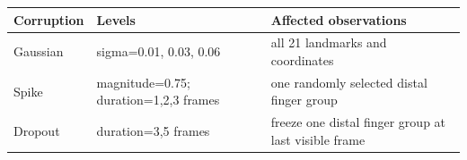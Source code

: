 \begin{tabular}{lll}
\toprule
Corruption & Levels & Affected observations \\
\midrule
Gaussian & sigma=0.01, 0.03, 0.06 & all 21 landmarks and coordinates \\
Spike & magnitude=0.75; duration=1,2,3 frames & one randomly selected distal finger group \\
Dropout & duration=3,5 frames & freeze one distal finger group at last visible frame \\
\bottomrule
\end{tabular}
